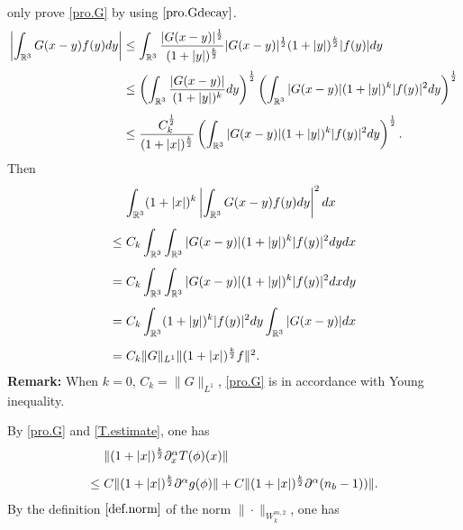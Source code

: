 \documentclass[11pt]{amsart}
\numberwithin{equation}{section}
\begin{document}
only prove \eqref{pro.G} by using $\eqref{pro.Gdecay}$.
\begin{eqnarray*}
\arraycolsep=1.5pt
\begin{array}[b]{rl}
\displaystyle\left| \int_{\mathbb{R}^{3}}G(x-y)f(y)dy \right|
\leq & \displaystyle \int_{\mathbb{R}^{3}}\frac{|G(x-y)|^{\frac{1}{2}}}{(1+|y|)^{\frac{k}{2}}}
|G(x-y)|^{\frac{1}{2}}(1+|y|)^{\frac{k}{2}}|f(y)|dy\\[5mm]
\leq &  \displaystyle \left(\int_{\mathbb{R}^{3}}\frac{|G(x-y)|}{(1+|y|)^{k}}dy\right)^{\frac{1}{2}}
\left(\int_{\mathbb{R}^{3}}|G(x-y)|(1+|y|)^{k}|f(y)|^2dy\right)^{\frac{1}{2}}\\[5mm]
\leq &  \displaystyle
\frac{C_{k}^{\frac{1}{2}}}{(1+|x|)^{\frac{k}{2}}}
\left(\int_{\mathbb{R}^{3}}|G(x-y)|(1+|y|)^{k}|f(y)|^2dy\right)^{\frac{1}{2}}.
\end{array}
\end{eqnarray*}
Then
\begin{eqnarray*}
\arraycolsep=1.5pt
\begin{array}[b]{rl}
 & \displaystyle \int_{\mathbb{R}^{3}}(1+|x|)^{k}\left| \int_{\mathbb{R}^{3}}G(x-y)f(y)dy \right|^2dx\\[5mm]
\leq & \displaystyle C_{k} \int_{\mathbb{R}^{3}}\int_{\mathbb{R}^{3}}|G(x-y)|(1+|y|)^{k}|f(y)|^2dydx\\[5mm]
= & \displaystyle  C_{k} \int_{\mathbb{R}^{3}}\int_{\mathbb{R}^{3}}|G(x-y)|(1+|y|)^{k}|f(y)|^2dxdy\\[5mm]
= & \displaystyle  C_{k} \int_{\mathbb{R}^{3}}(1+|y|)^{k}|f(y)|^2 dy \int_{\mathbb{R}^{3}}|G(x-y)|dx\\[5mm]
=& C_{k}\|G\|_{L^{1}}\|(1+|x|)^{\frac{k}{2}}f\|^2.
\end{array}
\end{eqnarray*}
\textbf{Remark:} When $k=0$, $C_{k}=\|G\|_{L^{1}}$, \eqref{pro.G} is  in accordance with Young inequality.

By \eqref{pro.G} and \eqref{T.estimate}, one has
\begin{eqnarray*}
\arraycolsep=1.5pt
\begin{array}[b]{rl}
      & \|(1+|x|)^{\frac{k}{2}}\partial_{x}^{\alpha}T(\phi)(x)\|\\[3mm]
 \leq & C\|(1+|x|)^{\frac{k}{2}}\partial^{\alpha}g(\phi)\|
 +C\|(1+|x|)^{\frac{k}{2}}\partial^{\alpha}(n_{b}-1))\|.
\end{array}
\end{eqnarray*}
By the definition $\eqref{def.norm}$ of the norm $
\|\cdot\|_{W^{m,2}_{k}}$, one has
\end{document}
